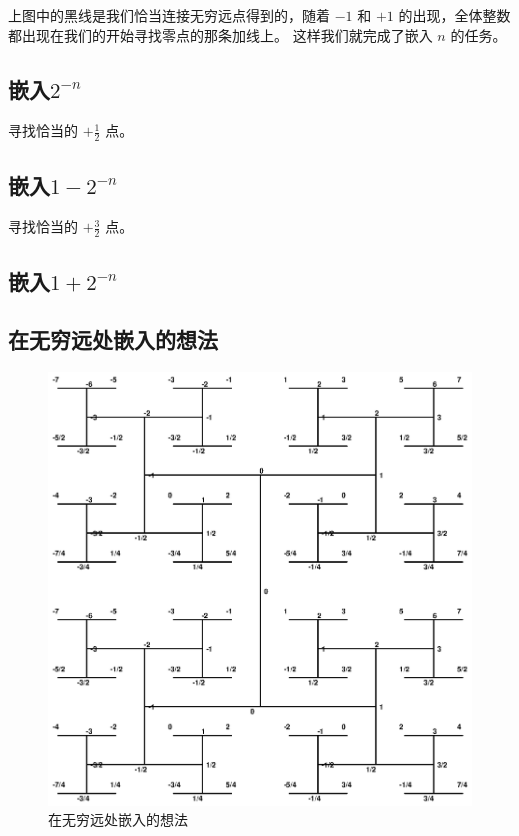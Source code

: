 \documentclass[a4paper,12pt]{article}
\begin{document}
上图中的黑线是我们恰当连接无穷远点得到的，随着 $-1$ 和 $+1$ 的出现，全体整数都出现在我们的开始寻找零点的那条加线上。
这样我们就完成了嵌入 $n$ 的任务。

\newpage

\subsection{嵌入$2^{-n}$}

寻找恰当的 $+\frac{1}{2}$ 点。

\newpage

\subsection{嵌入$1 - 2^{-n}$}

寻找恰当的 $+\frac{3}{2}$ 点。

\newpage

\subsection{嵌入$1 + 2^{-n}$}

\newpage

\subsection{在无穷远处嵌入的想法}

\begin{figure}[ht]
\centering
\includegraphics[width=7in]{images/labled-htree.eps}
\caption{在无穷远处嵌入的想法}
\end{figure}
\end{document}
